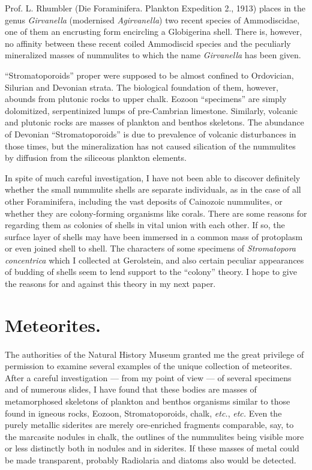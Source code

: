 \documentclass[a4paper, 12pt, oneside]{article}
\begin{document}
Prof. L. Rhumbler (Die Foraminifera. Plankton Expedition 2., 1913) places in the genus \emph{Girvanella} (modernised \emph{Agirvanella}) two recent species of Ammodiscidae, one of them an encrusting form encircling a Globigerina shell. There is, however, no affinity between these recent coiled Ammodiscid species and the peculiarly mineralized masses of nummulites to which the name \emph{Girvanella} has been given.

``Stromatoporoids'' proper were supposed to be almost confined to Ordovician, Silurian and Devonian strata. The biological foundation of them, however, abounds from plutonic rocks to upper chalk. Eozoon ``specimens'' are simply dolomitized, serpentinized lumps of pre-Cambrian limestone. Similarly, volcanic and plutonic rocks are masses of plankton and benthos skeletons. The abundance of Devonian ``Stromatoporoids'' is due to prevalence of volcanic disturbances in those times, but the mineralization has not caused silication of the nummulites by diffusion from the siliceous plankton elements.

In spite of much careful investigation, I have not been able to discover definitely whether the small nummulite shells are separate individuals, as in the case of all other Foraminifera, including the vast deposits of Cainozoic nummulites, or whether they are colony-forming organisms like corals. There are some reasons for regarding them as colonies of shells in vital union with each other. If so, the surface layer of shells may have been immersed in a common mass of protoplasm or even joined shell to shell. The characters of some specimens of \emph{Stromatopora concentrica} which I collected at Gerolstein, and also certain peculiar appearances of budding of shells seem to lend support to the ``colony'' theory. I hope to give the reasons for and against this theory in my next paper.

\section{Meteorites.}
\paragraph{}
The authorities of the Natural History Museum granted me the great privilege of permission to examine several examples of the unique collection of meteorites. After a careful investigation --- from my point of view --- of several specimens and of numerous slides, I have found that these bodies are masses of metamorphosed skeletons of plankton and benthos organisms similar to those found in igneous rocks, Eozoon, Stromatoporoids, chalk, \emph{etc.}, \emph{etc.} Even the purely metallic siderites are merely ore-enriched fragments comparable, say, to the marcasite nodules in chalk, the outlines of the nummulites being visible more or less distinctly both in nodules and in siderites. If these masses of metal could be made transparent, probably Radiolaria and diatoms also would be detected.
\end{document}
